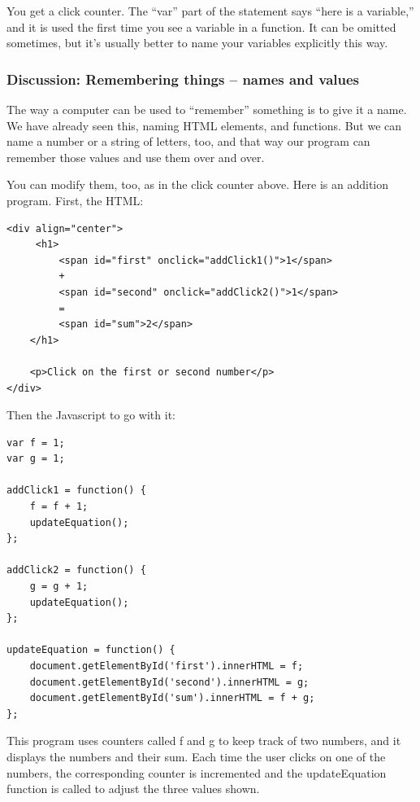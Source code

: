 \documentclass[11pt]{article}
\begin{document}
You get a click counter.  The ``var'' part of the statement says
``here is a variable,'' and it is used the first time you see a
variable in a function.  It can be omitted sometimes, but it's usually
better to name your variables explicitly this way.

\subsubsection{Discussion: Remembering things -- names and values}

The way a computer can be used to ``remember'' something is to give it
a name.  We have already seen this, naming HTML elements, and
functions.  But we can name a number or a string of letters, too, and
that way our program can remember those values and use them over and
over.

You can modify them, too, as in the click counter above.  Here is an
addition program.  First, the HTML:

\begin{verbatim}
<div align="center">
     <h1>
         <span id="first" onclick="addClick1()">1</span>
         +
         <span id="second" onclick="addClick2()">1</span>
         =
         <span id="sum">2</span>
    </h1>

    <p>Click on the first or second number</p>
</div>
\end{verbatim}

Then the Javascript to go with it:

\begin{verbatim}
var f = 1;
var g = 1;

addClick1 = function() {
    f = f + 1;
    updateEquation();
};

addClick2 = function() {
    g = g + 1;
    updateEquation();
};

updateEquation = function() {
    document.getElementById('first').innerHTML = f;
    document.getElementById('second').innerHTML = g;
    document.getElementById('sum').innerHTML = f + g;
};
\end{verbatim}

This program uses counters called f and g to keep track of two
numbers, and it displays the numbers and their sum.  Each time the
user clicks on one of the numbers, the corresponding counter is
incremented and the updateEquation function is called to adjust the
three values shown.
\end{document}
